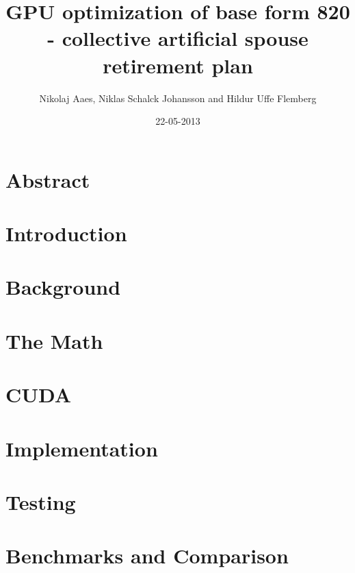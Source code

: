 \documentclass[12pt]{article}
\title{GPU optimization of base form 820 - collective artificial spouse retirement plan}
\author{Nikolaj Aaes, Niklas Schalck Johansson and Hildur Uffe Flemberg}
\date{22-05-2013}
\begin{document}
	\maketitle
	
	
	\section{Abstract}
	
	
	
	\section{Introduction}
	
	
		
	\section{Background}
		
	
		
	\section{The Math}
		
	
		
	\section{CUDA}

	
		
	\section{Implementation}
		
	
		
	\section{Testing}
		
	
		
	\section{Benchmarks and Comparison}
		
\end{document}
